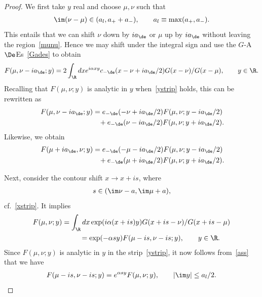 \begin{proof}
We f\/irst take $y$ real and choose $\mu,\nu$ such that
\begin{gather}\label{ass}
\im(\nu-\mu)\in  (a_l,a_{+}+a_{-}),\qquad a_l\equiv \max(a_{+},a_{-}).
\end{gather}
This entails that we can shift $\nu$ down by $ia_{\de}$ or $\mu$ up by $ia_{\de}$ without leaving the region~\eqref{munu}. Hence we may shift under the integral sign and use the $G$-A$\De$Es~\eqref{Gades} to obtain
\begin{gather}
F(\mu,\nu-ia_{\de};y)=2\int_{\R}dxe^{i\alpha xy}c_{-\de}(x-\nu+ia_{\de}/2)G(x-\nu)/G(x-\mu),\qquad y\in\R.
\end{gather}
Recalling that $F(\mu,\nu;y)$ is analytic in $y$ when~\eqref{ystrip} holds, this can be rewritten as
\begin{gather}
F(\mu,\nu-ia_{\de};y)=e_{-\de}(-\nu+ia_{\de}/2)F(\mu,\nu;y-ia_{\de}/2)\nonumber\\
\phantom{F(\mu,\nu-ia_{\de};y)=}{}
+e_{-\de}(\nu-ia_{\de}/2)F(\mu,\nu;y+ia_{\de}/2).\label{Fs1}
\end{gather}
Likewise, we obtain
\begin{gather}
F(\mu+ia_{\de},\nu;y)=e_{-\de}(-\mu-ia_{\de}/2)F(\mu,\nu;y-ia_{\de}/2)\nonumber\\
\phantom{F(\mu+ia_{\de},\nu;y)=}{}
+e_{-\de}(\mu+ia_{\de}/2)F(\mu,\nu;y+ia_{\de}/2).\label{Fs2}
\end{gather}

Next, consider the contour shift $x\to x+is$, where
\begin{gather}
s\in (\im\nu-a,\im \mu+a),
\end{gather}
cf.~\eqref{xstrip}. It implies
\begin{gather}
F(\mu,\nu;y)     =     \int_{\R}dx\exp(i\alpha (x+is)y)G(x+is-\nu)/G(x+is-\mu)
\nonumber \\
\phantom{F(\mu,\nu;y)     =}{}  =    \exp(-\alpha sy)F(\mu-is,\nu-is;y),\qquad y\in\R.\label{xshi}
\end{gather}
Since $F(\mu,\nu;y)$ is analytic in $y$ in the strip~\eqref{ystrip}, it now follows from~\eqref{ass} that we have
\begin{gather}\label{Fkey}
F(\mu-is,\nu-is;y)=e^{\alpha sy}F(\mu,\nu;y),\qquad |\im y|\le a_l/2.
\end{gather}


\end{proof}
